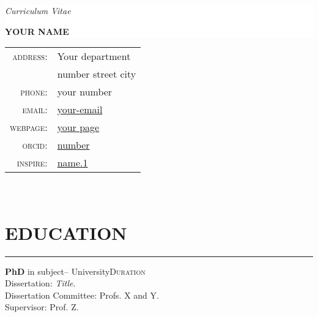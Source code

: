 \documentclass[a4paper,10pt]{article}
\newcommand*{\img}[1]{%
    \raisebox{-0.1cm}{%
        \texttt{[image: \#1]}%
    }%
}
\newcommand*{\imgg}[1]{%
    \raisebox{-0.1cm}{%
        \texttt{[image: \#1]}%
    }%
}
\begin{document}
\noindent\hspace*{-0.8in}%
\colorbox{white}{
\begin{minipage}{\paperwidth}%
    \vspace{7ex}
    \color{white}
    
    \par{\centering
        \vspace{-0.9in}
        {\color{black}\emph{Curriculum Vitae}}
        
		\vspace{2ex}
		{\color{linkcolour} \textbf{\Large YOUR NAME}} \par}
\end{minipage}
}
\vspace{1ex}
\pagestyle{empty} %


\begin{center}
\begin{tabular}{rl}
    \textsc{address:}   & Your department \\ & number street city \\
    \textsc{phone:}     & your number\\
    \textsc{email:}     & \href{mailto:your-email@address}{your-email}\\
    \textsc{webpage:} & \href{address}{your page}\\
\textsc{orcid:} 
& \href{http://orcid.org/number}{number}\\
\textsc{inspire:}
    & \href{http://inspirehep.net/author/profile/name.1}{name.1}
    \end{tabular}
\end{center}



\section{\\EDUCATION}
\vspace{-3ex}\noindent\rule{\textwidth}{0.7pt}

 \textbf{PhD} in subject-- {University}\hfill  \textsc{Duration} 
\\
Dissertation: \emph{Title}.
\\
Dissertation Committee: Profs. X and Y.
\\
Supervisor: Prof. Z.
\end{document}

